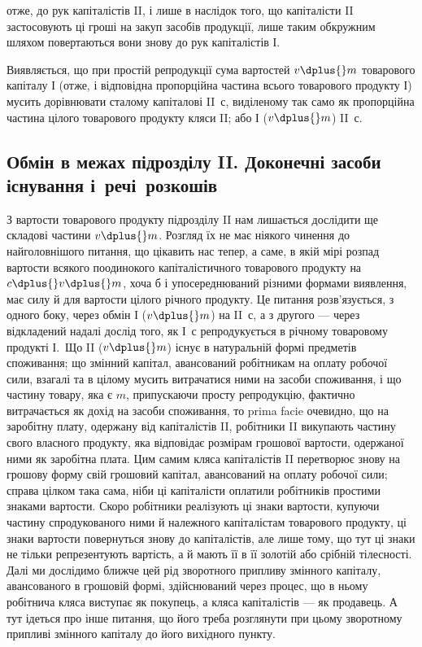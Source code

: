 \parcont{}  %
отже, до рук капіталістів II, і лише в наслідок того, що капіталісти II застосовують
ці гроші на закуп засобів продукції, лише таким обкружним
шляхом повертаються вони знову до рук капіталістів І.

Виявляється, що при простій репродукції сума вартостей $v \dplus{} m$ товарового
капіталу І (отже, і відповідна пропорційна частина всього товарового
продукту І) мусить дорівнювати сталому капіталові II~$с$, виділеному
так само як пропорційна частина цілого товарового продукту кляси II;
або І ($v \dplus{} m$) \deq{} II~с.

\subsection{Обмін в межах підрозділу II. Доконечні засоби існування
 і~речі~розкошів}

З вартости товарового продукту підрозділу II нам лишається дослідити
ще складові частини $v \dplus{} m$. Розгляд їх не має ніякого чинення до
найголовнішого питання, що цікавить нас тепер, а саме, в якій мірі
розпад вартости всякого поодинокого капіталістичного товарового продукту
на $c \dplus{} v \dplus{} m$, хоча б і упосереднюваний різними формами виявлення,
має силу й для вартости цілого річного продукту. Це питання
розв’язується, з одного боку, через обмін І ($v \dplus{} m$) на II~$с$, а з другого
— через відкладений надалі дослід того, як І~$с$ репродукується в
річному товаровому продукті І.~Що II ($v \dplus{} m$) існує в натуральній формі
предметів споживання; що змінний капітал, авансований робітникам на
оплату робочої сили, взагалі та в цілому мусить витрачатися ними на
засоби споживання, і що частину товару, яка є $m$, припускаючи просту
репродукцію, фактично витрачається як дохід на засоби споживання, то
prima facie очевидно, що на заробітну плату, одержану від капіталістів
II, робітники II викупають частину свого власного продукту, яка відповідає
розмірам грошової вартости, одержаної ними як заробітна плата. Цим
самим кляса капіталістів II перетворює знову на грошову форму свій
грошовий капітал, авансований на оплату робочої сили; справа цілком
така сама, ніби ці капіталісти оплатили робітників простими знаками вартости.
Скоро робітники реалізують ці знаки вартости, купуючи частину
спродукованого ними й належного капіталістам товарового продукту, ці
знаки вартости повернуться знову до капіталістів, але лише тому, що тут
ці знаки не тільки репрезентують вартість, а й мають її в її золотій
або срібній тілесності. Далі ми дослідимо ближче цей рід зворотного
припливу змінного капіталу, авансованого в грошовій формі, здійснюваний
через процес, що в ньому робітнича кляса виступає як покупець, а
кляса капіталістів — як продавець. А тут ідеться про інше питання,
що його треба розглянути при цьому зворотному припливі змінного
капіталу до його вихідного пункту.

